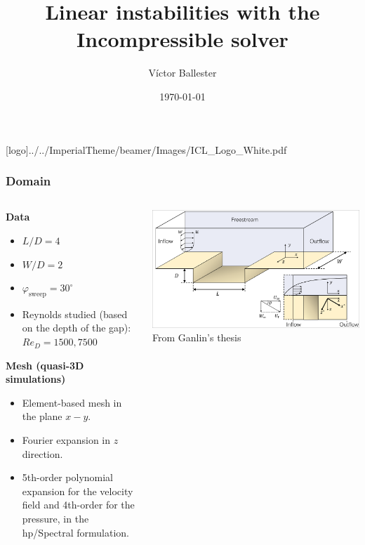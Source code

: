 \documentclass[
	aspectratio=169, %
	t, %
	onlytextwidth, %
	10pt, %
]{beamer}
\title{Linear instabilities with the Incompressible solver} %
\subtitle{} %
\author{Víctor Ballester} %
\date{\today} %
\def\imagefolder{../../ImperialTheme/beamer/Images}
\begin{document}
\begingroup
{} %
[logo]{\imagefolder/ICL_Logo_White.pdf} %
\frame[plain, s]{\titlepage} %
\endgroup

\begin{frame}
	\frametitle{Domain}

	\begin{columns}[T] %
		\begin{column}{0.48\linewidth} %
			\textbf{Data}
			\begin{itemize}
				\item $L/D = 4$
				\item $W/D = 2$
				\item $\varphi_\text{sweep} = 30^\circ$
				\item Reynolds studied (based on the depth of the gap): $Re_D = 1500,7500$
			\end{itemize}

			\textbf{Mesh (quasi-3D simulations)}
			\begin{itemize}
				\item Element-based mesh in the plane $x-y$.
				\item Fourier expansion in $z$ direction.
				\item 5th-order polynomial expansion for the velocity field and 4th-order for the pressure, in the hp/Spectral formulation.
			\end{itemize}
		\end{column}
		\begin{column}{0.48\linewidth} %
			\includegraphics[trim=0.2cm 0.5cm 0.1cm 0.1cm, clip, width=\linewidth]{Images/domain.png} %
			{\tiny\textcolor{ICLBlue}{From Ganlin's thesis}}
		\end{column}
	\end{columns}
\end{frame}
\end{document}

